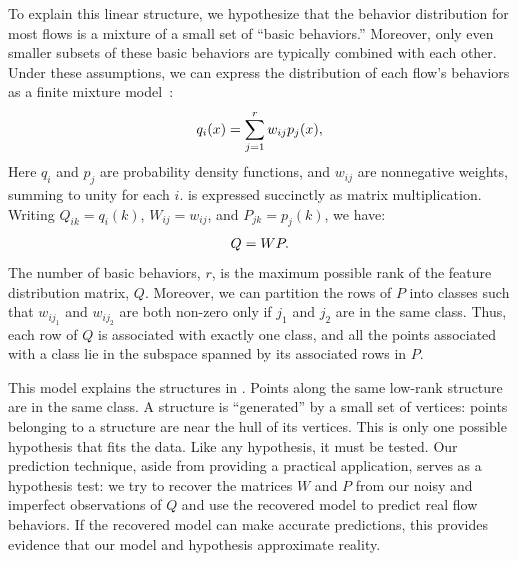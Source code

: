 \documentclass{acm_proc_article-sp}
\begin{document}
To explain this linear structure, we hypothesize that the behavior distribution for most flows is a mixture of a small set of ``basic behaviors.''
Moreover, only even smaller subsets of these basic behaviors are typically combined with each other.
Under these assumptions, we can express the distribution of each flow's behaviors as a finite mixture model~\cite{McLachlan00}:
\begin{align}\eqn{mixture-model}
  q_i(x) = \sum_{j=1}^r w_{ij} p_j(x),
\end{align}
Here $q_i$ and $p_j$ are probability density functions, and $w_{ij}$ are nonnegative weights, summing to unity for each $i$.
 is expressed succinctly as matrix multiplication.
Writing $Q_{ik} = q_i(k)$, $W_{ij} = w_{ij}$, and $P_{jk} = p_j(k)$, we have:
\begin{align}\eqn{mixture-model-matrix}
  Q = WP.
\end{align}
The number of basic behaviors, $r$, is the maximum possible rank of the feature distribution matrix, $Q$.
Moreover, we can partition the rows of $P$ into classes such that $w_{ij_1}$ and $w_{ij_2}$ are both non-zero only if $j_1$ and $j_2$ are in the same class.
Thus, each row of $Q$ is associated with exactly one class, and all the points associated with a class lie in the subspace spanned by its associated rows in $P$.

This model explains the structures in .
Points along the same low-rank structure are in the same class.
A structure is ``generated'' by a small set of vertices:
points belonging to a structure are near the hull of its vertices.
This is only one possible hypothesis that fits the data.
Like any hypothesis, it must be tested.
Our prediction technique, aside from providing a practical application, serves as a hypothesis test:
we try to recover the matrices $W$ and $P$ from our noisy and imperfect observations of $Q$ and use the recovered model to predict real flow behaviors.
If the recovered model can make accurate predictions, this provides evidence that our model and hypothesis approximate reality.

\end{document}
